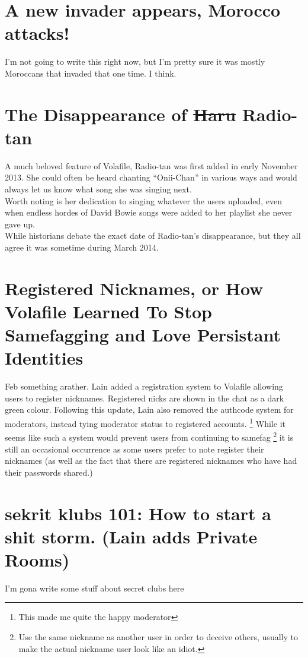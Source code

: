 \documentclass[12pt]{report}
\begin{document}
{\section{A new invader appears, Morocco attacks!}
I'm not going to write this right now, but I'm pretty sure it was mostly Moroccans that invaded that one time. I think.

\section[The Disappearance of  Radio-tan]{The Disappearance of \sout{Haru} Radio-tan\footnotemark} 
	A much beloved feature of Volafile, Radio-tan was first added in early November 2013. She could often be heard chanting ``Onii-Chan'' in various ways and would always let us know what song she was singing next.\\
	Worth noting is her dedication to singing whatever the users uploaded, even when endless hordes of David Bowie songs were added to her playlist she never gave up.\\
	While historians debate the exact date of Radio-tan's disappearance, but they all agree it was sometime during March 2014.

\vfill
\pagebreak

\section[Registered Nicknames]{Registered Nicknames, or How Volafile Learned To Stop Samefagging and Love Persistant Identities\footnotemark}
Feb something arather. Lain added a registration system to Volafile allowing users to register nicknames. Registered nicks are shown in the chat as a dark green colour. Following this update, Lain also removed the authcode system for moderators, instead tying moderator status to registered accounts.
	\footnote{This made me quite the happy moderator} While it seems like such a system would prevent users from continuing to samefag
	\footnote{Use the same nickname as another user in order to deceive others, usually to make the actual nickname user look like an idiot.}
 it is still an occasional occurrence as some users prefer to note register their nicknames (as well as the fact that there are registered nicknames who have had their passwords shared.)

\section[sekrit klubs 101]{sekrit klubs 101: How to start a shit storm. (Lain adds Private Rooms)}
	I'm gona write some stuff about secret clubs here 

}
\end{document}
